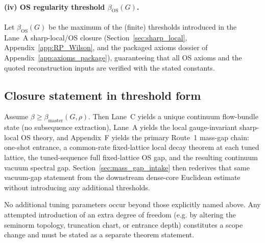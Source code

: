 \paragraph{(iv) OS regularity threshold $\beta_{\mathrm{OS}}(G)$.}
Let $\beta_{\mathrm{OS}}(G)$ be the maximum of the (finite) thresholds introduced in the Lane~A sharp-local/OS closure
(Section~\ref{sec:sharp_local}, Appendix~\ref{app:RP_Wilson}, and the packaged axioms dossier of Appendix~\ref{app:axioms_package}), guaranteeing that all OS axioms and the quoted reconstruction inputs are verified with the
stated constants.

\subsection{Closure statement in threshold form}

Assume $\beta\ge \beta_{\mathrm{master}}(G,\rho)$.
Then Lane~C yields a unique continuum flow-bundle state (no subsequence extraction), Lane~A yields the local gauge-invariant sharp-local OS theory, and Appendix~F yields the primary Route~1 mass-gap chain: one-shot entrance, a common-rate fixed-lattice local decay theorem at each tuned lattice, the tuned-sequence full fixed-lattice OS gap, and the resulting continuum vacuum spectral gap.
Section~\ref{sec:mass_gap_intake} then rederives that same vacuum-gap statement from the downstream dense-core Euclidean estimate without introducing any additional thresholds.

\begin{remark}
\label{rem:fail_closed_parameter_schedule}
No additional tuning parameters occur beyond those explicitly named above.
Any attempted introduction of an extra degree of freedom (e.g. by altering the seminorm topology, truncation chart,
or entrance depth) constitutes a scope change and must be stated as a separate theorem statement.
\end{remark}
